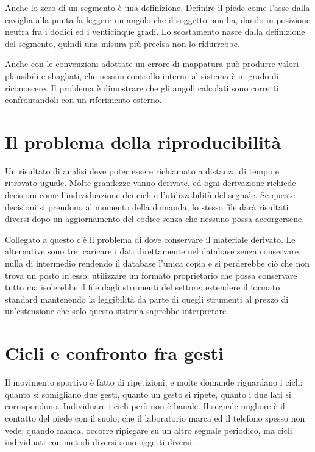 Anche lo zero di un segmento è una definizione. Definire il piede come l'asse
dalla caviglia alla punta fa leggere un angolo che il
soggetto non ha, dando in posizione neutra fra i dodici ed i venticinque gradi.
Lo scostamento nasce dalla definizione del segmento, quindi una misura più precisa
non lo ridurrebbe.

Anche con le convenzioni adottate un errore di mappatura può produrre valori
plausibili e sbagliati, che nessun controllo interno al sistema è in grado di
riconoscere. Il problema è dimostrare che gli angoli calcolati sono corretti
confrontandoli con un riferimento esterno.

\section{Il problema della riproducibilità}
\label{sec:ch2:riproducibilita}

Un risultato di analisi deve poter essere richiamato a distanza di tempo e ritrovato
uguale. Molte grandezze vanno derivate, ed ogni derivazione richiede decisioni come
l'individuazione dei cicli e l'utilizzabilità del segnale. Se
queste decisioni si prendono al momento della domanda, lo stesso file darà
risultati diversi dopo un aggiornamento del codice senza che nessuno possa accorgersene.

Collegato a questo c'è il problema di dove conservare il materiale derivato. Le
alternative sono tre: caricare i dati direttamente nel database senza conservare nulla
di intermedio rendendo il database l'unica copia e si perderebbe ciò
che non trova un posto in esso; utilizzare un formato proprietario che possa conservare tutto ma isolerebbe il
file dagli strumenti del settore; estendere il formato standard mantenendo la leggibilità
da parte di quegli strumenti al prezzo di un'estensione che solo questo sistema saprebbe
interpretare.

\section{Cicli e confronto fra gesti}
\label{sec:ch2:cicli}

Il movimento sportivo è fatto di ripetizioni, e molte domande riguardano i
cicli: quanto si somigliano due gesti, quanto un gesto si ripete, quanto i
due lati si corrispondono\dots Individuare i cicli però non è banale. Il segnale
migliore è il contatto del piede con il suolo, che il laboratorio marca ed il
telefono spesso non vede; quando manca, occorre ripiegare su un altro segnale
periodico, ma cicli individuati con metodi diversi sono oggetti diversi.

